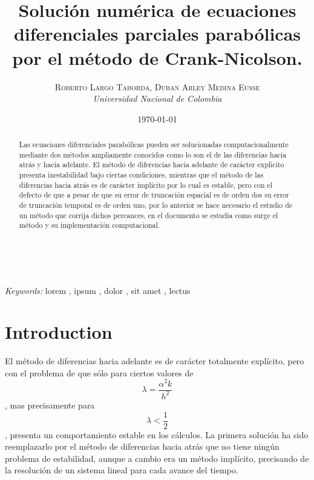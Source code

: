 \documentclass[11pt]{article} %
\title{\textbf{Solución numérica de ecuaciones diferenciales parciales parabólicas por el método de Crank-Nicolson.}\\ %
}
\author{\textsc{Roberto Largo Taborda, Duban Arley Medina Eusse} %
\\{\textit{Universidad Nacional de Colombia}}} %
\date{\today} %
\makeatletter
\renewcommand{\maketitle}{ %
\begin{flushright} %
{\LARGE\@title} %

\vspace{50pt} %

{\large\@author} %
\\\@date %

\vspace{40pt} %
\end{flushright}
}
\makeatother
\begin{document}
\maketitle %


\renewcommand{\abstractname}{Resumen} %

\begin{abstract}
Las ecuaciones diferenciales parabólicas pueden ser solucionadas computacionalmente mediante dos métodos ampliamente conocidos como lo son el de las diferencias hacia atrás y hacia adelante. El método de diferencias hacia adelante de carácter explicito presenta inestabilidad bajo ciertas condiciones, mientras que el método de las diferencias hacia atrás es de carácter implícito por lo cual es estable, pero con el defecto de que a pesar de que su error de truncación espacial es de orden dos su error de truncación temporal es de orden uno, por lo anterior se hace necesario el estudio de un método que corrija dichos percances, en el documento se estudia como surge el método y su implementación computacional.
\end{abstract}

\hspace*{3,6mm}\textit{Keywords:} lorem , ipsum , dolor , sit amet , lectus %

\vspace{30pt} %


\section*{Introduction}

El método de diferencias hacia adelante es de carácter totalmente explícito, pero con el problema de que sólo para ciertos valores de
\begin{equation}
\lambda =\frac{\alpha ^2 k}{h^2}
\end{equation}
, mas precisamente para
\begin{equation}
\lambda < \frac{1}{2}
\end{equation}, presenta un comportamiento estable en los cálculos. La primera solución ha sido reemplazarlo por el método de diferencias hacia atrás que no tiene ningún problema de estabilidad, aunque a cambio era un método implícito, precisando de la resolución de un sistema lineal para cada avance del tiempo.
\end{document}

